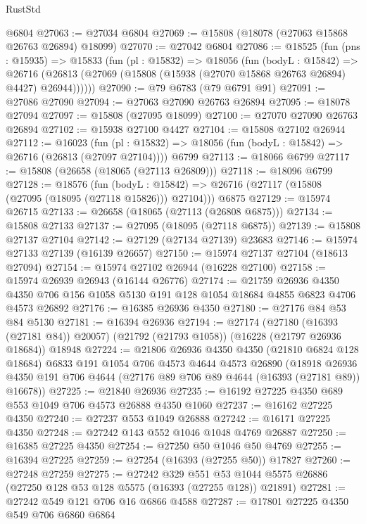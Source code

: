 \begin{lexlean}{RustStd}
\begin{coremodule}
    @6804
@27063 := @27034 @6804
@27069 := @15808 (@18078 (@27063 @15868 @26763 @26894) @18099)
@27070 := @27042 @6804
@27086 := @18525
    (fun (pns : @15935) =>
    @15833
      (fun (pl : @15832) =>
      @18056
        (fun (bodyL : @15842) =>
        @26716 (@26813 (@27069 (@15808 (@15938 (@27070 @15868 @26763 @26894) @4427) @26944))))))
@27090 := @79 @6783 (@79 @6791 @91)
@27091 := @27086 @27090
@27094 := @27063 @27090 @26763 @26894
@27095 := @18078 @27094
@27097 := @15808 (@27095 @18099)
@27100 := @27070 @27090 @26763 @26894
@27102 := @15938 @27100 @4427
@27104 := @15808 @27102 @26944
@27112 := @16023
    (fun (pl : @15832) => @18056 (fun (bodyL : @15842) => @26716 (@26813 (@27097 @27104))))
    @6799
@27113 := @18066 @6799
@27117 := @15808 (@26658 (@18065 (@27113 @26809)))
@27118 := @18096 @6799
@27128 := @18576
    (fun (bodyL : @15842) => @26716 (@27117 (@15808 (@27095 (@18095 (@27118 @15826))) @27104)))
    @6875
@27129 := @15974 @26715
@27133 := @26658 (@18065 (@27113 (@26808 @6875)))
@27134 := @15808 @27133
@27137 := @27095 (@18095 (@27118 @6875))
@27139 := @15808 @27137 @27104
@27142 := @27129 (@27134 @27139) @23683
@27146 := @15974 @27133 @27139 (@16139 @26657)
@27150 := @15974 @27137 @27104 (@18613 @27094)
@27154 := @15974 @27102 @26944 (@16228 @27100)
@27158 := @15974 @26939 @26943 (@16144 @26776)
@27174 := @21759
    @26936
    @4350
    @4350
    @706
    @156
    @1058
    @5130
    @191
    @128
    @1054
    @18684
    @4855
    @6823
    @4706
    @4573
    @26892
@27176 := @16385 @26936 @4350
@27180 := @27176 @84 @53 @84 @5130
@27181 := @16394 @26936
@27194 := @27174
    (@27180 (@16393 (@27181 @84)) @20057)
    (@21792 (@21793 @1058))
    (@16228 (@21797 @26936 @18684))
    @18948
@27224 := @21806
    @26936
    @4350
    @4350
    (@21810 @6824 @128 @18684)
    @6833
    @191
    @1054
    @706
    @4573
    @4644
    @4573
    @26890
    (@18918 @26936 @4350 @191 @706 @4644 (@27176 @89 @706 @89 @4644 (@16393 (@27181 @89)) @16678))
@27225 := @21840 @26936
@27235 := @16192 @27225 @4350 @689 @553 @1049 @706 @4573 @26888 @4350 @1060
@27237 := @16162 @27225 @4350
@27240 := @27237 @553 @1049 @26888
@27242 := @16171 @27225 @4350
@27248 := @27242 @143 @552 @1046 @1048 @4769 @26887
@27250 := @16385 @27225 @4350
@27254 := @27250 @50 @1046 @50 @4769
@27255 := @16394 @27225
@27259 := @27254 (@16393 (@27255 @50)) @17827
@27260 := @27248 @27259
@27275 := @27242
    @329
    @551
    @53
    @1044
    @5575
    @26886
    (@27250 @128 @53 @128 @5575 (@16393 (@27255 @128)) @21891)
@27281 := @27242 @549 @121 @706 @16 @6866 @4588
@27287 := @17801 @27225 @4350 @549 @706 @6860 @6864

\end{coremodule}
\end{lexlean}
